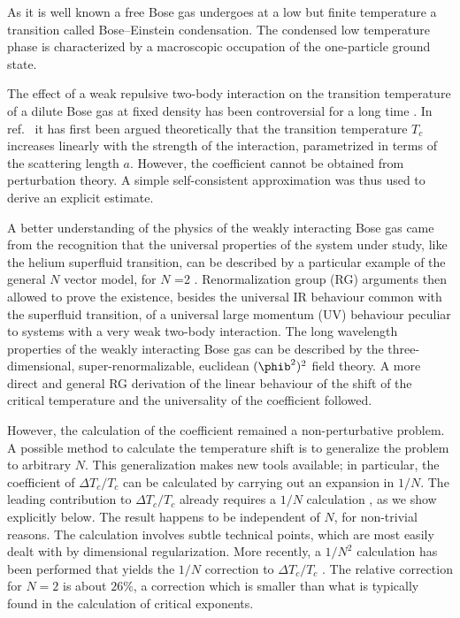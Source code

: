 As it is well known a free Bose gas undergoes at a low but finite temperature a transition called Bose--Einstein condensation. The condensed low temperature phase is characterized by a macroscopic occupation of the one-particle ground state. \sslbl\scBEC \par
The effect of a weak repulsive two-body interaction on the transition temperature of a dilute Bose gas at fixed density has been controversial for a long time
{}. In ref.~ it has first been argued theoretically
 that the transition temperature $T_c$ increases linearly with the strength of the interaction, parametrized in terms of the scattering length $a$. However, the coefficient cannot be obtained from perturbation theory.  A simple self-consistent approximation was thus used to derive an explicit estimate. \par
A better understanding of the physics of the weakly interacting Bose gas came from the recognition that the universal properties of the system under study, like the helium superfluid transition, can be described by a particular example of the general $N$ vector model, for $N$ =2 .
Renormalization group (RG) arguments then allowed to prove the existence, besides the universal IR behaviour common with the superfluid transition, of a universal large momentum (UV) behaviour peculiar to systems with a very weak two-body interaction. The long wavelength properties of the weakly interacting Bose gas can be described by the three-dimensional, super-renormalizable, euclidean  $(\phib^2)^2$ field theory. A more direct and general RG derivation of the linear behaviour of the shift of the critical temperature and the universality of the coefficient followed.
\par
However, the calculation of the coefficient remained a non-perturbative problem. A possible method to calculate the temperature shift is to generalize the problem to arbitrary $N$.  This generalization makes new tools available; in particular, the coefficient of $\Delta T_c/T_c$ can be calculated by carrying out an expansion in $1/N$.  The leading contribution to $\Delta T_c/T_c$
already requires  a $1/N$ calculation , as we show explicitly below.
The result happens to be independent of $N$, for non-trivial reasons.  The
calculation involves subtle technical points, which are most easily dealt with by dimensional regularization.  More recently, a $1/N^2$ calculation
has been performed that yields the $1/N$ correction to $ \Delta
T_c/T_c$ . The relative correction for $N=2$ is about
$26\%$, a  correction which is smaller than what is typically found in the calculation of critical exponents. \par
%
